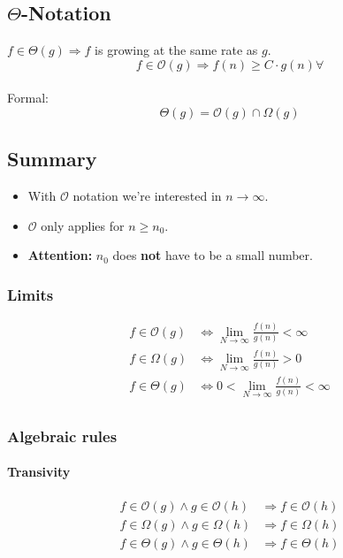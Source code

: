 \documentclass[12pt, a4paper]{scrartcl}
\newcommand{\bigO}{\mathcal{O}}
\begin{document}
\subsection{$\Theta$-Notation}
\label{sec:Theta-notation}
$f\in\Theta(g)\Rightarrow f$ is growing at the same rate as $g$.
\[f\in\mathcal{O}(g)\Rightarrow f(n)\ge C\cdot g(n)\forall\]\\
Formal:
\[\Theta(g)=\mathcal{O}(g)\cap\Omega(g)
\]

\subsection{Summary}
\label{sec:O-notation}
\begin{itemize}
\item With $\bigO$ notation we're interested in $n\rightarrow\infty$. 
\item $\bigO$ only applies for $n\ge n_0$.
\item \textbf{Attention:} $n_0$ does \textbf{not} have to be a small number.
\end{itemize}


\subsubsection{Limits}
\begin{align}
  f\in\mathcal{O}(g)&\Leftrightarrow\lim_{N\rightarrow\infty}\frac{f(n)}{g(n)}<\infty\\
  f\in\Omega(g)&\Leftrightarrow\lim_{N\rightarrow\infty}\frac{f(n)}{g(n)}>0\\
  f\in\Theta(g)&\Leftrightarrow0<\lim_{N\rightarrow\infty}\frac{f(n)}{g(n)}<\infty\\
\end{align}

\subsubsection{Algebraic rules}
\paragraph{Transivity}
\begin{align}
  f\in\mathcal{O}(g)\land g\in\mathcal{O}(h)&\Rightarrow f \in \mathcal{O}(h)\\
  f\in\Omega(g)\land g\in\Omega(h)&\Rightarrow f \in \Omega(h)\\
  f\in\Theta(g)\land g\in\Theta(h)&\Rightarrow f \in \Theta(h)\\
\end{align}
\end{document}
